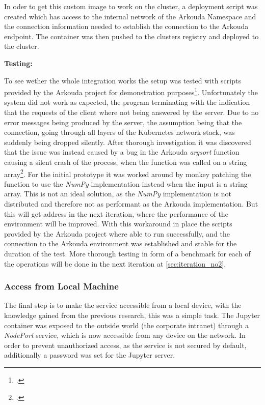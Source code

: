 In oder to get this custom image to work on the cluster,
a deployment script was created which has access to the internal network of the Arkouda Namespace and the
connection information needed to establish the connection to the Arkouda endpoint.
The container was then pushed to the clusters \gls{registry} and deployed to the cluster.

\textbf{Testing: }
\label{testing_iteration_no1}

To see wether the whole integration works the setup was
tested with scripts provided by the Arkouda project for demonstration purposes\footcite{arkouda-repoBearsRUsArkoudaNotebooksPlace}.
Unfortunately the system did not work as expected, the program terminating with the indication that the
requests of the client where not being answered by the server.
Due to no error messages being produced by the server,
the assumption being that the connection, going through all layers of the Kubernetes network stack,
was suddenly being dropped silently. After thorough investigation it was discovered that the
issue was instead caused by a bug in the Arkouda \textit{argsort} function causing a silent
crash of the process, when the function was called on a string array\footcite{hokiegeek2CommitsBearsRUsArkouda}.
For the initial prototype it was worked around by \gls{monkey patching} the function to use the \textit{NumPy} implementation
instead when the input is a string array.
This is not an ideal solution, as the \textit{NumPy} implementation is not distributed and therefore not as performant as the Arkouda implementation.
But this will get address in the next iteration, where the performance of the environment will be improved.
With this workaround in place the scripts provided by the Arkouda project where able to run successfully,
and the connection to the Arkouda environment was established and stable for the duration of the test.
More thorough testing in form of a benchmark for each of the operations will be done in the next iteration at \autoref{sec:iteration_no2}.


\subsubsection{Access from Local Machine}
The final step is to make the service accessible from a local device,
with the knowledge gained from the previous research, this was a simple task.
The Jupyter container was exposed to the outside world (the corporate intranet)
through a \textit{NodePort} service, which is now accessible from any device on the network.
In order to prevent unauthorized access, as the service is not secured by default,
additionally a password was set for the Jupyter server.

